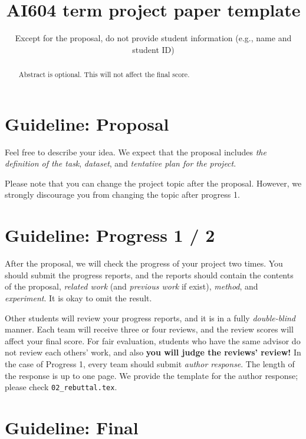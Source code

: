 \documentclass[final]{cvpr}
\begin{document}
\title{AI604 term project paper template}

\author{Except for the proposal, do not provide student information (e.g., name and student ID)
}

\maketitle


\begin{abstract}
Abstract is optional. This will not affect the final score.
\end{abstract}

\section{Guideline: Proposal}

Feel free to describe your idea. We expect that the proposal includes \textit{the definition of the task}, \textit{dataset}, and \textit{tentative plan for the project}.

Please note that you can change the project topic after the proposal. However, we strongly discourage you from changing the topic after progress 1.

\section{Guideline: Progress 1 / 2}

After the proposal, we will check the progress of your project two times. You should submit the progress reports, and the reports should contain the contents of the proposal, \textit{related work} (and \textit{previous work} if exist), \textit{method}, and \textit{experiment}. It is okay to omit the result.

Other students will review your progress reports, and it is in a fully \textit{double-blind} manner. Each team will receive three or four reviews, and the review scores will affect your final score. For fair evaluation, students who have the same advisor do not review each others' work, and also \textbf{you will judge the reviews' review!} In the case of Progress 1, every team should submit \textit{author response}. The length of the response is up to one page. We provide the template for the author response; please check \texttt{02\_rebuttal.tex}.

\section{Guideline: Final}
\end{document}
